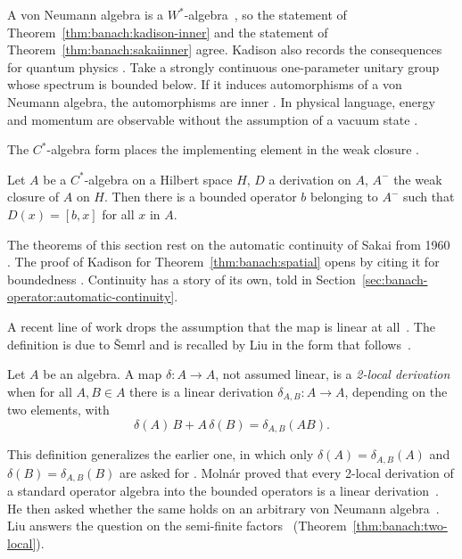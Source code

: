 A von Neumann algebra is a $W^*$-algebra~\cite[p.~2]{Sakai1991Dynamical}, so
the statement of Theorem~\ref{thm:banach:kadison-inner} and the statement of
Theorem~\ref{thm:banach:sakaiinner} agree. Kadison also records the
consequences for quantum physics
\cite[p.~291]{Kadison1966}. Take a strongly continuous one-parameter unitary
group whose spectrum is bounded below. If it induces automorphisms of a von
Neumann algebra, the automorphisms are inner \cite[p.~291]{Kadison1966}. In
physical language, energy and momentum are observable without the assumption
of a vacuum state \cite[p.~291]{Kadison1966}.

The $C^*$-algebra form places the
implementing element in the weak closure
\cite[Theorem~2, p.~279]{Sakai1966}.

\begin{theorem}\label{thm:banach:sakaiclosure}
Let $A$ be a $C^*$-algebra on a Hilbert space $H$, $D$ a derivation on $A$,
$A^-$ the weak closure of $A$ on $H$. Then there is a bounded operator $b$
belonging to $A^-$ such that $D(x)=[b,x]$ for all $x$ in $A$.
\end{theorem}

The theorems of this section rest on the automatic continuity of Sakai from
1960 \cite[p.~283]{Kadison1966}. The proof of Kadison for
Theorem~\ref{thm:banach:spatial} opens by citing it for boundedness
\cite[p.~283]{Kadison1966}. Continuity has a story of its own, told in
Section~\ref{sec:banach-operator:automatic-continuity}.

A recent line of work drops the assumption that the map is linear at
all~\cite[p.~909]{Liu2025TwoLocal}. The
definition is due to Šemrl and is recalled by Liu in the form that
follows~\cite[Definition~1.2, p.~909]{Liu2025TwoLocal}.

\begin{definition}\label{def:banach:two-local}
Let $A$ be an algebra. A map $\delta\colon A \to A$, not assumed linear, is a
\emph{2-local derivation} when for all $A, B \in A$ there is a linear
derivation $\delta_{A,B}\colon A \to A$, depending on the two elements, with
\[
  \delta(A)\,B + A\,\delta(B) = \delta_{A,B}(AB).
\]
\end{definition}

This definition generalizes the earlier one, in which only $\delta(A) =
\delta_{A,B}(A)$ and $\delta(B) = \delta_{A,B}(B)$ are asked for
\cite[p.~909]{Liu2025TwoLocal}. Molnár proved that every 2-local derivation of
a standard operator algebra into the bounded operators is a linear
derivation~\cite[p.~910]{Liu2025TwoLocal}. He then asked whether the same
holds on an arbitrary von Neumann algebra~\cite[p.~910]{Liu2025TwoLocal}. Liu
answers the question on the semi-finite factors~
(Theorem~\ref{thm:banach:two-local})\cite[Theorem~2.1,
p.~910]{Liu2025TwoLocal}.

